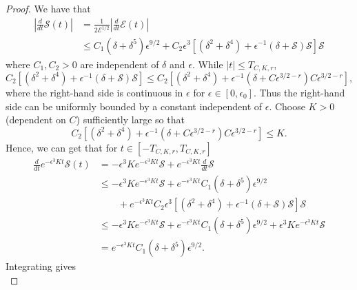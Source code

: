 \begin{proof}
	We have that
	\begin{equation}
	\begin{aligned}
		\left | \frac d {dt} \mathcal S(t) \right | &= \frac 1 {2 \mathcal E ^{1/2}} \left | \frac d {dt} \mathcal E(t) \right| \\
		&\leq C_1(\delta + \delta^5) \epsilon^{9/2} + C_2 \epsilon^3\left[ (\delta^2 + \delta^4) + \epsilon^{-1}(\delta + \mathcal S) \mathcal S \right]\mathcal S
	\end{aligned}
	\end{equation}
	where \(C_1, C_2 > 0\) are independent of \(\delta\) and \(\epsilon\). While \(|t| \leq T_{C,K,r}\),
	\begin{equation}
		C_2 \left[ (\delta^2 + \delta^4) + \epsilon^{-1}(\delta + \mathcal S) \mathcal S \right] \leq C_2 \left[ (\delta^2 + \delta^4) + \epsilon^{-1}(\delta +  C\epsilon^{3/2-r}) C \epsilon^{3/2-r} \right],
	\end{equation}
	where the right-hand side is continuous in \(\epsilon \) for \(\epsilon \in [0,\epsilon_0]\). Thus the right-hand side can be uniformly bounded by a constant independent of \(\epsilon\). Choose \(K>0\) (dependent on \(C\)) sufficiently large so that 
	\begin{equation}\label{K-def}
		C_2 \left[ (\delta^2 + \delta^4) + \epsilon^{-1}(\delta +  C\epsilon^{3/2-r}) C \epsilon^{3/2-r} \right] \leq K.
	\end{equation}
	Hence, we can get that for \(t \in [-T_{C,K,r}, T_{C,K,r}]\) 
	\begin{equation}
	\begin{aligned}
		\frac d {dt} e^{-\epsilon^3 K t} \mathcal S(t) &= - \epsilon^3 K e^{-\epsilon^3 K t} \mathcal S  + e^{-\epsilon^3 K t} \frac d {dt} \mathcal S \\
		&\leq - \epsilon^3 K e^{-\epsilon^3 K t} \mathcal S  + e^{-\epsilon^3 K t}C_1(\delta + \delta^5) \epsilon^{9/2} \\
		&\qquad+ e^{-\epsilon^3 K t}C_2 \epsilon^3\left[ (\delta^2 + \delta^4) + \epsilon^{-1}(\delta + \mathcal S) \mathcal S \right]\mathcal S \\
		&\leq - \epsilon^3 K e^{-\epsilon^3 K t} \mathcal S  +  e^{-\epsilon^3 K t}C_1(\delta + \delta^5) \epsilon^{9/2} + \epsilon^3 K e^{-\epsilon^3 K t}\mathcal S \\
		&= e^{-\epsilon^3 K t}C_1(\delta + \delta^5) \epsilon^{9/2}.
	\end{aligned}
	\end{equation}
	Integrating gives
	\begin{equation} 

\end{equation}
\end{proof}
